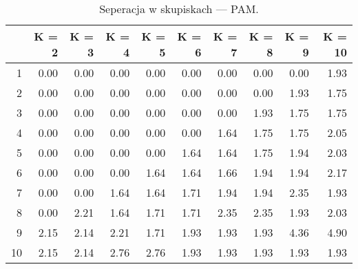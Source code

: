 \begin{table}[ht]
\centering
\begin{tabular}{rrrrrrrrrr}
  \hline
 & K = 2 & K = 3 & K = 4 & K = 5 & K = 6 & K = 7 & K = 8 & K = 9 & K = 10 \\ 
  \hline
1 & 0.00 & 0.00 & 0.00 & 0.00 & 0.00 & 0.00 & 0.00 & 0.00 & 1.93 \\ 
  2 & 0.00 & 0.00 & 0.00 & 0.00 & 0.00 & 0.00 & 0.00 & 1.93 & 1.75 \\ 
  3 & 0.00 & 0.00 & 0.00 & 0.00 & 0.00 & 0.00 & 1.93 & 1.75 & 1.75 \\ 
  4 & 0.00 & 0.00 & 0.00 & 0.00 & 0.00 & 1.64 & 1.75 & 1.75 & 2.05 \\ 
  5 & 0.00 & 0.00 & 0.00 & 0.00 & 1.64 & 1.64 & 1.75 & 1.94 & 2.03 \\ 
  6 & 0.00 & 0.00 & 0.00 & 1.64 & 1.64 & 1.66 & 1.94 & 1.94 & 2.17 \\ 
  7 & 0.00 & 0.00 & 1.64 & 1.64 & 1.71 & 1.94 & 1.94 & 2.35 & 1.93 \\ 
  8 & 0.00 & 2.21 & 1.64 & 1.71 & 1.71 & 2.35 & 2.35 & 1.93 & 2.03 \\ 
  9 & 2.15 & 2.14 & 2.21 & 1.71 & 1.93 & 1.93 & 1.93 & 4.36 & 4.90 \\ 
  10 & 2.15 & 2.14 & 2.76 & 2.76 & 1.93 & 1.93 & 1.93 & 1.93 & 1.93 \\ 
   \hline
\end{tabular}
\caption{Seperacja w skupiskach --- PAM.} 
\label{PAM1}
\end{table}
